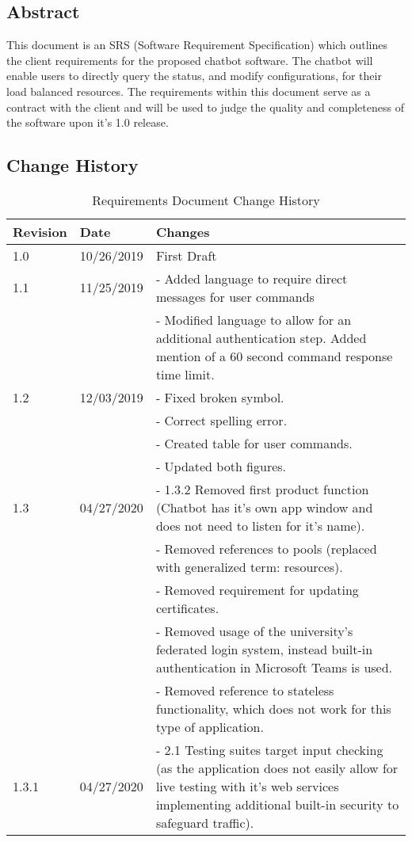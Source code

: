 \subsection{Abstract}
This document is an SRS (Software Requirement Specification) which outlines the client requirements for the proposed chatbot software.
The chatbot will enable users to directly query the status, and modify configurations, for their load balanced resources.
The requirements within this document serve as a contract with the client and will be used to judge the quality and completeness of the software upon it's 1.0 release.

\subsection {Change History}
\begin{longtable}{ | p{1in} p{1in} p{4in} | }
 \caption{Requirements Document Change History}
 \\\hline
 \textbf{Revision} & \textbf{Date} & \textbf{Changes} \\
 \hline
 1.0 & 10/26/2019 
 & First Draft \\
 \hline
 1.1 & 11/25/2019 
   & - Added language to require direct messages for user commands \\
 & & - Modified language to allow for an additional authentication step. Added mention of a 60 second command response time limit.\\
 \hline
 1.2 & 12/03/2019
   & - Fixed broken symbol.\\
 & & - Correct spelling error.\\
 & & - Created table for user commands.\\
 & & - Updated both figures.\\
 \hline
 1.3 & 04/27/2020
 &   - 1.3.2 Removed first product function (Chatbot has it's own app window and does not need to listen for it's name).\\
 & & - Removed references to pools (replaced with generalized term: resources).\\
 & & - Removed requirement for updating certificates.\\
 & & - Removed usage of the university's federated login system, instead built-in authentication in Microsoft Teams is used. \\
 & & - Removed reference to stateless functionality, which does not work for this type of application. \\
 \hline
 1.3.1 & 04/27/2020
   & - 2.1 Testing suites target input checking (as the application does not easily allow for live testing with it's web services implementing additional built-in security to safeguard traffic).\\

\end{longtable}
